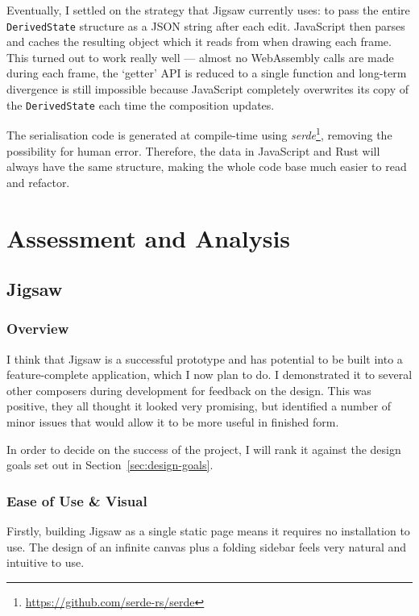 \documentclass[12pt]{article}
\newcommand{\footurl}[1]{\footnote{\url{#1}}}
\begin{document}
Eventually, I settled on the strategy that Jigsaw currently uses:  to pass the entire
\verb|DerivedState| structure as a JSON string after each edit.  JavaScript then parses and caches
the resulting object which it reads from when drawing each frame.  This turned out to work really
well --- almost no WebAssembly calls are made during each frame, the `getter' API is reduced to a
single function and long-term divergence is still impossible because JavaScript completely
overwrites its copy of the \verb|DerivedState| each time the composition updates.

The serialisation code is generated at compile-time using
\emph{serde}\footurl{https://github.com/serde-rs/serde}, removing the possibility for human error.
Therefore, the data in JavaScript and Rust will always have the same structure, making the whole
code base much easier to read and refactor.



\pagebreak

\section{Assessment and Analysis}

\subsection{Jigsaw}

\subsubsection{Overview}

I think that Jigsaw is a successful prototype and has potential to be built into a  feature-complete
application, which I now plan to do. I demonstrated it to several other composers during development
for feedback on the design.  This was positive, they all thought it looked very promising, but
identified a number of minor issues that would allow it to be more useful in finished form.

In order to decide on the success of the project, I will rank it against the design goals set out in
Section~\ref{sec:design-goals}.

\subsubsection{Ease of Use \& Visual}

Firstly, building Jigsaw as a single static page means it requires no installation to use.  The
design of an infinite canvas plus a folding sidebar feels very natural and intuitive to use.
\end{document}
